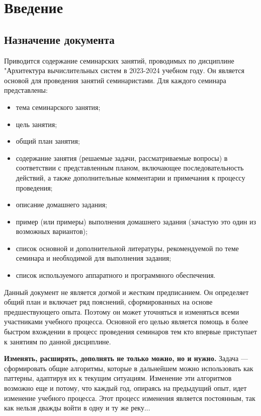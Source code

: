 
\chapter* {Введение}

\section*{Назначение документа}

Приводится содержание семинарских занятий, проводимых по дисциплине "Архитектура вычислительных систем в 2023-2024 учебном году. Он является основой для проведения занятий семинаристами. Для каждого семинара представлены:
\begin{itemize}
    \item тема семинарского занятия;
    \item цель занятия;
    \item общий план занятия;
    \item содержание занятия (решаемые задачи, рассматриваемые вопросы) в соответствии с представленным планом, включающее последовательность действий, а также дополнительные комментарии и примечания к процессу проведения;
    \item описание домашнего задания;
    \item пример (или примеры) выполнения домашнего задания (зачастую это один из возможных вариантов);
    \item список основной и дополнительной литературы, рекомендуемой по теме семинара и необходимой для выполнения задания;
    \item список используемого аппаратного и программного обеспечения.
\end{itemize}

Данный документ не является догмой и жестким предписанием. Он определяет общий план и включает ряд пояснений, сформированных на основе предшествующего опыта. Поэтому он может уточняться и изменяться всеми участниками учебного процесса. Основной его целью является помощь в более быстром вхождении в процесс проведения семинаров тем кто впервые приступает к занятиям по данной дисциплине.

\textbf{Изменять, расширять, дополнять не только можно, но и нужно.} Задача --- сформировать общие алгоритмы, которые в дальнейшем можно использовать как паттерны, адаптируя их к текущим ситуациям. Изменение эти алгоритмов возможно еще и потому, что каждый год, опираясь на предыдущий опыт, идет изменение учебного процесса. Этот процесс изменения является постоянным, так как нельзя дважды войти в одну и ту же реку...

